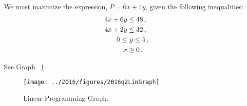 %
%
\usetikzlibrary{patterns}

\begin{subquestions}
	

\subquestion

We must maximize the expression, $P=6x+4y$, given the following inequalities:
\begin{align}
	4x+6y & \leq 48\,, \nonumber \\
	4x+2y & \leq 32\,, \nonumber \\
	0 \leq & ~ y \leq 5\,, \nonumber \\
	x & \geq 0\,.
\end{align}

\begin{subsubquestions}

	
\subsubquestion

See Graph ~\ref{2016:q2:graph:Graph1}.
\begin{figure}
	\begin{center}
		\texttt{[image: ../2016/figures/2016q2LinGraph]}
		\caption{\label{2016:q2:graph:Graph1} Linear Programming Graph.}
	\end{center}
\end{figure}



\subsubquestion


\end{subsubquestions}
\end{subquestions}
